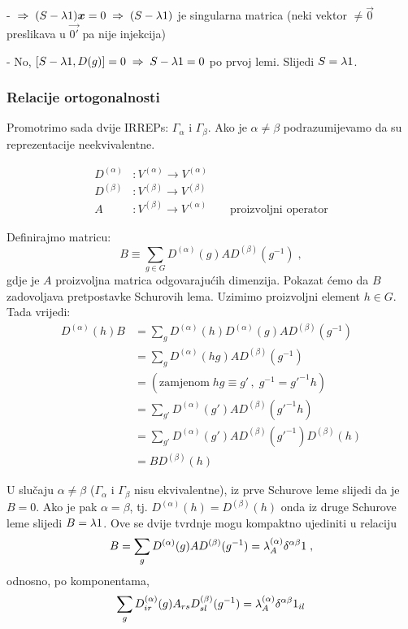 - $\imp (S-\lambda\Eins)\vec{x}=0 \imp (S-\lambda\Eins)$
  je singularna matrica (neki vektor $\neq \vec{0}$ preslikava u
  $\vec{0'}$ pa nije injekcija)

- No, $[S-\lambda1, D(g)]=0 \;\Rightarrow\; S-\lambda1 =0$
  po prvoj lemi. Slijedi $S=\lambda1$.




\subsubsection*{Relacije ortogonalnosti}
\label{sec:ortogonalnost}

Promotrimo sada dvije IRREPs: $\Gamma_{\alpha}$ i $\Gamma_{\beta}$.
Ako je $\alpha\neq\beta$ podrazumijevamo da su reprezentacije
neekvivalentne.

\begin{align*}
D^{(\alpha)} &: V^{(\alpha)} \to V^{(\alpha)} \\
D^{(\beta)}  &: V^{(\beta)}  \to V^{(\beta)} \\
A          &: V^{(\beta)} \to V^{(\alpha)} \qquad \text{proizvoljni operator}
\end{align*}

Definirajmo matricu:
\begin{equation*}
B\equiv \sum_{g\in G} D^{(\alpha)}(g) A D^{(\beta)}(g^{-1}) \;,
\end{equation*}
gdje je $A$ proizvoljna matrica odgovarajućih dimenzija.
Pokazat ćemo da $B$ zadovoljava pretpostavke Schurovih lema.
Uzimimo proizvoljni element $h\in G$. Tada vrijedi:
\begin{equation*}
\begin{split}
 D^{(\alpha)}(h)B &= \sum_g D^{(\alpha)}(h) D^{(\alpha)}(g) A
    D^{(\beta)}(g^{-1}) \\
&= \sum_g D^{(\alpha)}(hg) A D^{(\beta)}(g^{-1}) \\
&= ( \textrm{zamjenom}\; hg\equiv g' \, , \; g^{-1}=g'^{-1}h ) \\
&= \sum_{g'} D^{(\alpha)}(g') A D^{(\beta)}(g'^{-1}h) \\
&= \sum_{g'} D^{(\alpha)}(g') A D^{(\beta)}(g'^{-1}) D^{(\beta)}(h) \\
&= B D^{(\beta)}(h)
\end{split}
\end{equation*}

U slučaju $\alpha\neq\beta$ ($\Gamma_\alpha$ i $\Gamma_\beta$ nisu 
ekvivalentne),
iz prve Schurove leme slijedi da je $B=0$. Ako je pak $\alpha=\beta$, tj.
$D^{(\alpha)}(h)=D^{(\beta)}(h)$ onda iz druge Schurove leme
slijedi $B=\lambda 1$.
Ove se dvije tvrdnje mogu kompaktno ujediniti u relaciju
\begin{displaymath}
  B = \sum_g D^{(\alpha)}(g) A D^{(\beta)}(g^{-1}) =
 \lambda^{(\alpha)}_A \delta^{\alpha\beta} 1 \;,
\end{displaymath}
odnosno, po komponentama,
\begin{displaymath}
\sum_g D^{(\alpha)}_{ir}(g) A_{rs} D^{(\beta)}_{sl}(g^{-1})
 = \lambda_{A}^{(\alpha)} \delta^{\alpha\beta} 1_{il}
\end{displaymath}

